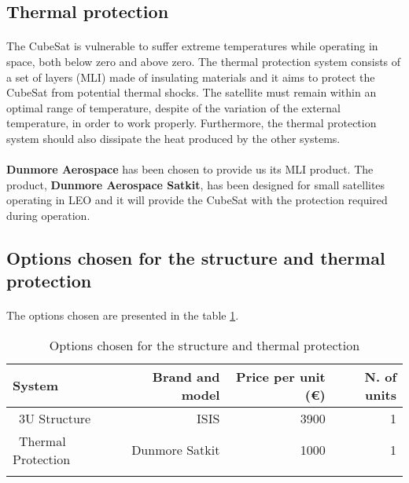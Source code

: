 \subsection{Thermal protection}

\paragraph{}The CubeSat is vulnerable to suffer extreme temperatures while operating in space, both below zero and above zero. The thermal protection system consists of a set of layers (MLI) made of insulating materials and it aims to protect the CubeSat from potential thermal shocks. The satellite must remain within an optimal range of temperature, despite of the variation of the external temperature, in order to work properly. Furthermore, the thermal protection system should also dissipate the heat produced by the other systems.

\paragraph{}\textbf{Dunmore Aerospace} has been chosen to provide us its MLI product. The product, \textbf{Dunmore Aerospace Satkit}, has been designed for small satellites operating in LEO and it will provide the CubeSat with the protection required during operation.

\subsection{Options chosen for the structure and thermal protection}
\paragraph{}The options chosen are presented in the table \ref{structurefinal}.

\begin{longtable}{| l | r | r | r | }
\hline
\rowcolor[gray]{0.80}	\textbf{System} &  \textbf{Brand and model}     & \textbf{Price per unit (\euro)} & \textbf{N. of units}  \\
\hline
\endfirsthead

	   ~3U Structure & ISIS & 3900 & 1 \\
	   \hline
	   ~Thermal Protection & Dunmore Satkit & 1000 & 1\\
	\hline

\caption{Options chosen for the structure and thermal protection}
\label{structurefinal}
\end{longtable}
